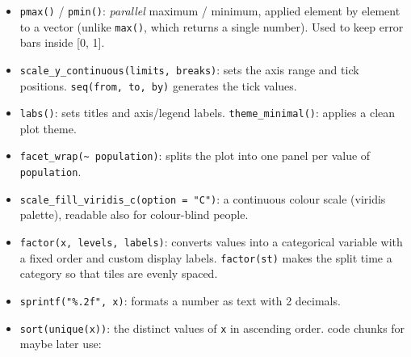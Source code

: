 \documentclass[
]{article}
\begin{document}
\begin{itemize}
\item
  \texttt{pmax()} / \texttt{pmin()}: \emph{parallel} maximum / minimum,
  applied element by element to a vector (unlike \texttt{max()}, which
  returns a single number). Used to keep error bars inside {[}0, 1{]}.
\item
  \texttt{scale\_y\_continuous(limits,\ breaks)}: sets the axis range
  and tick positions. \texttt{seq(from,\ to,\ by)} generates the tick
  values.
\item
  \texttt{labs()}: sets titles and axis/legend labels.
  \texttt{theme\_minimal()}: applies a clean plot theme.
\item
  \texttt{facet\_wrap(\textasciitilde{}\ population)}: splits the plot
  into one panel per value of \texttt{population}.
\item
  \texttt{scale\_fill\_viridis\_c(option\ =\ "C")}: a continuous colour
  scale (viridis palette), readable also for colour-blind people.
\item
  \texttt{factor(x,\ levels,\ labels)}: converts values into a
  categorical variable with a fixed order and custom display labels.
  \texttt{factor(st)} makes the split time a category so that tiles are
  evenly spaced.
\item
  \texttt{sprintf("\%.2f",\ x)}: formats a number as text with 2
  decimals.
\item
  \texttt{sort(unique(x))}: the distinct values of \texttt{x} in
  ascending order. code chunks for maybe later use:
\end{itemize}
\end{document}
